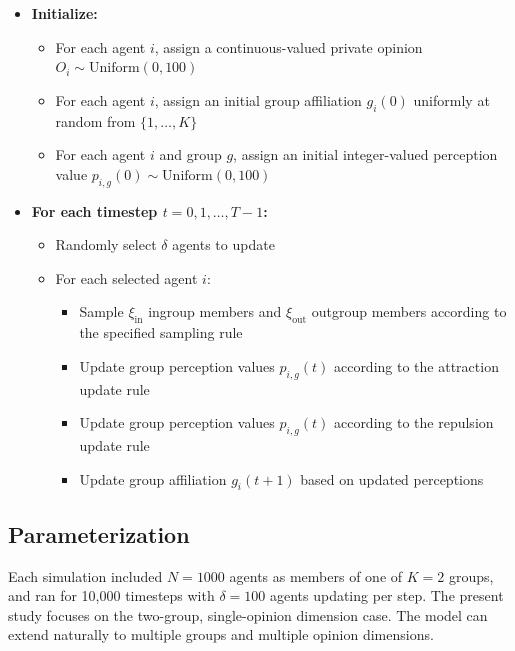 \begin{tcolorbox}[title=\textbf{Simulation procedure}, colback=white, colframe=black]
\begin{itemize}[left=1em]
    \item \textbf{Initialize:}
    \begin{itemize}
        \item For each agent \(i\), assign a continuous-valued private opinion \(O_i \sim \text{Uniform}(0,100)\)
        \item For each agent \(i\), assign an initial group affiliation \(g_i(0)\) uniformly at random from \(\{1,\dots,K\}\)
        \item For each agent \(i\) and group \(g\), assign an initial integer-valued perception value \(p_{i,g}(0) \sim \text{Uniform}(0,100)\)
    \end{itemize}

    \item \textbf{For each timestep \(t = 0,1,\dots,T-1\):}
    \begin{itemize}
        \item Randomly select \(\delta\) agents to update
        \item For each selected agent \(i\):
        \begin{itemize}
            \item Sample \(\xi_{\text{in}}\) ingroup members and \(\xi_{\text{out}}\) outgroup members according to the specified sampling rule
            \item Update group perception values \(p_{i,g}(t)\) according to the attraction update rule
            \item Update group perception values \(p_{i,g}(t)\) according to the repulsion update rule
            \item Update group affiliation \(g_i(t+1)\) based on updated perceptions
        \end{itemize}
    \end{itemize}
\end{itemize}
\end{tcolorbox}

\subsection{Parameterization}

Each simulation included $N = 1000$ agents as members of one of $K = 2$ groups, and ran for 10,000 timesteps with $\delta = 100$ agents updating per step. The present study focuses on the two-group, single-opinion dimension case. The model can extend naturally to multiple groups and multiple opinion dimensions. 

